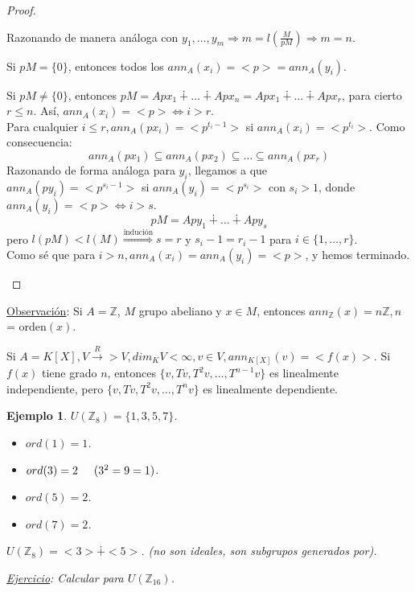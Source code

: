 \documentclass[11pt,a4paper]{article}
\theoremstyle{break}
\newtheorem{example}[theorem]{Ejemplo}
\begin{document}
\begin{proof}
\begin{itemize}
\begin{itemize}
Razonando de manera análoga con $y_{1}, \dots, y_{m} \Rightarrow m = l(\frac{M}{pM}) \Rightarrow m = n$.

Si $pM = \{0\}$, entonces todos los  $ann_{A}(x_{i}) = <p> = ann_{A}(y_{i})$.

Si $pM \neq \{0\}$, entonces $pM = Apx_{1} \dotplus \dots \dotplus Apx_{n} = Apx_{1} \dotplus \dots \dotplus Apx_{r}$, para cierto $r \leq n$. Así, $ann_{A}(x_{i}) = <p> \iff i > r$. \\
Para cualquier $i \leq r, ann_{A}(px_{i}) = <p^{t_{i}-1}>$ si $ann_{A}(x_{i}) = <p^{t_{i}}>$. Como consecuencia:
$$ann_{A}(px_{1}) \subseteq ann_{A}(px_{2}) \subseteq \dots \subseteq ann_{A}(px_{r})$$
Razonando de forma análoga para $y_{i}$, llegamos a que \\ $ann_{A}(py_{i}) = <p^{s_{i}-1}>$ si $ann_{A}(y_{i}) = <p^{s_{i}}>$ con $s_{i} > 1$, donde $ann_{A}(y_{i}) = <p> \iff i > s$.
$$pM = Apy_{1} \dotplus \dots \dotplus Apy_{s}$$
pero $l(pM) < l(M) \overset{\text{indución}}{\Rightarrow} s = r$ y $s_{i} - 1 = r_{i} - 1$ para $i \in \{1, \dots, r\}$. \\
Como sé que para $i > n, ann_{A}(x_{i}) = ann_{A}(y_{i}) = <p>$, y hemos terminado.
\end{itemize}
\end{itemize}
\end{proof}


\underline{Observación}: Si $A = \mathbb{Z}$, $M$ grupo abeliano y $x \in M$, entonces $ann_{\mathbb{Z}}(x) = n\mathbb{Z}, n$ = orden$(x)$.

Si $A = K[X], V \overset{R}{\to} >V, dim_{K}V < \infty, v \in V, ann_{K[X]}(v) = <f(x)>$. Si $f(x)$ tiene grado $n$, entonces $\{v, Tv, T^{2}v, \dots, T^{n-1}v\}$ es linealmente independiente, pero $\{v, Tv, T^{2}v, \dots, T^{n}v\}$ es linealmente dependiente.

\begin{example}
$U(\mathbb{Z}_{8}) = \{1, 3, 5, 7\}$.
\begin{itemize}
\item $ord(1) = 1$.
\item $ord(3) = 2 \hspace{0.5cm} (3^{2} = 9 = 1)$.
\item $ord(5) = 2$.
\item $ord(7) = 2$.
\end{itemize}
$U(\mathbb{Z}_{8}) = <3> \dotplus <5>$. (no son ideales, son subgrupos generados por).

\underline{Ejercicio}: Calcular para $U(\mathbb{Z}_{16})$.
\end{example}
\end{document}
